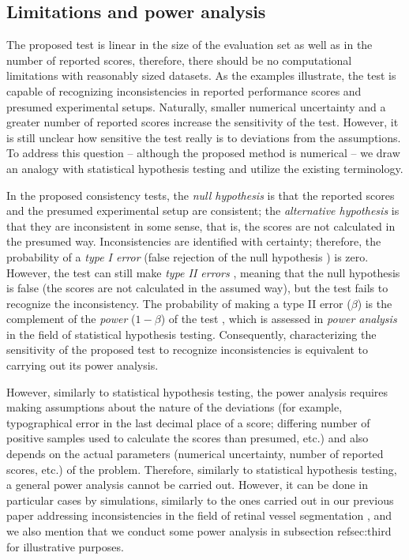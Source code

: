 \documentclass[3p, times]{elsarticle}
\begin{document}
{
\color{blue}

\subsection{Limitations and power analysis}
\label{sec:indpower}

The proposed test is linear in the size of the evaluation set as well as in the number of reported scores, therefore, there should be no computational limitations with reasonably sized datasets. As the examples illustrate, the test is capable of recognizing inconsistencies in reported performance scores and presumed experimental setups. Naturally, smaller numerical uncertainty and a greater number of reported scores increase the sensitivity of the test. However, it is still unclear how sensitive the test really is to deviations from the assumptions. To address this question -- although the proposed method is numerical -- we draw an analogy with statistical hypothesis testing and utilize the existing terminology.

In the proposed consistency tests, the \emph{null hypothesis} is that the reported scores and the presumed experimental setup are consistent; the \emph{alternative hypothesis} is that they are inconsistent in some sense, that is, the scores are not calculated in the presumed way. Inconsistencies are identified with certainty; therefore, the probability of a \emph{type I error} (false rejection of the null hypothesis \cite{statdict}) is zero. However, the test can still make \emph{type II errors} \cite{statdict}, meaning that the null hypothesis is false (the scores are not calculated in the assumed way), but the test fails to recognize the inconsistency. The probability of making a type II error ($\beta$) is the complement of the \emph{power} ($1 - \beta$) of the test \cite{statdict}, which is assessed in \emph{power analysis} \cite{statdict} in the field of statistical hypothesis testing. Consequently, characterizing the sensitivity of the proposed test to recognize inconsistencies is equivalent to carrying out its power analysis.

However, similarly to statistical hypothesis testing, the power analysis requires making assumptions about the nature of the deviations (for example, typographical error in the last decimal place of a score; differing number of positive samples used to calculate the scores than presumed, etc.) and also depends on the actual parameters (numerical uncertainty, number of reported scores, etc.) of the problem. Therefore, similarly to statistical hypothesis testing, a general power analysis cannot be carried out. However, it can be done in particular cases by simulations, similarly to
the ones carried out in our previous paper addressing inconsistencies in the field of retinal vessel segmentation \cite{vessel}, and we also mention that we conduct some power analysis in subsection ref{sec:third} for illustrative purposes.}
\end{document}
